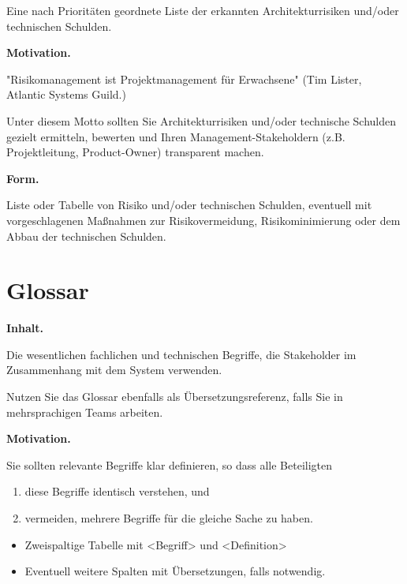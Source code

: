 \documentclass[]{article}
\begin{document}
Eine nach Prioritäten geordnete Liste der erkannten Architekturrisiken
und/oder technischen Schulden.

\textbf{Motivation.}

"Risikomanagement ist Projektmanagement für Erwachsene" (Tim Lister,
Atlantic Systems Guild.)

Unter diesem Motto sollten Sie Architekturrisiken und/oder technische
Schulden gezielt ermitteln, bewerten und Ihren Management-Stakeholdern
(z.B. Projektleitung, Product-Owner) transparent machen.

\textbf{Form.}

Liste oder Tabelle von Risiko und/oder technischen Schulden, eventuell
mit vorgeschlagenen Maßnahmen zur Risikovermeidung, Risikominimierung
oder dem Abbau der technischen Schulden.

\section{Glossar}\label{section-glossary}

\textbf{Inhalt.}

Die wesentlichen fachlichen und technischen Begriffe, die Stakeholder im
Zusammenhang mit dem System verwenden.

Nutzen Sie das Glossar ebenfalls als Übersetzungsreferenz, falls Sie in
mehrsprachigen Teams arbeiten.

\textbf{Motivation.}

Sie sollten relevante Begriffe klar definieren, so dass alle Beteiligten

\begin{enumerate}
\def\labelenumi{\arabic{enumi}.}
\item
  diese Begriffe identisch verstehen, und
\item
  vermeiden, mehrere Begriffe für die gleiche Sache zu haben.
\end{enumerate}

\begin{itemize}
\item
  Zweispaltige Tabelle mit \textless{}Begriff\textgreater{} und
  \textless{}Definition\textgreater{}
\item
  Eventuell weitere Spalten mit Übersetzungen, falls notwendig.
\end{itemize}
\end{document}

